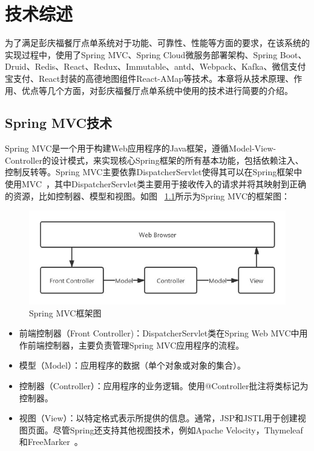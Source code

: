 \chapter{技术综述}
为了满足彭庆福餐厅点单系统对于功能、可靠性、性能等方面的要求，在该系统的实现过程中，使用了Spring MVC、Spring Cloud微服务部署架构、Spring Boot、Druid、Redis、React、Redux、Immutable、antd、Webpack、Kafka、微信支付宝支付、React封装的高德地图组件React-AMap等技术。本章将从技术原理、作用、优点等几个方面，对彭庆福餐厅点单系统中使用的技术进行简要的介绍。

\section{Spring MVC技术}
Spring MVC是一个用于构建Web应用程序的Java框架，遵循Model-View-Controller的设计模式，来实现核心Spring框架的所有基本功能，包括依赖注入、控制反转等。Spring MVC主要依靠DispatcherServlet使得其可以在Spring框架中使用MVC~\cite{tyd2019}，其中DispatcherServlet类主要用于接收传入的请求并将其映射到正确的资源，比如控制器、模型和视图。如图
~\ref{fig_springMVCCH2}所示为Spring MVC的框架图：
\begin{figure}[htbp!]
    \centering
    \includegraphics[width=5in]{FIGs/chapter2/springMVC.pdf}
    \caption{Spring MVC框架图}\label{fig_springMVCCH2}
\end{figure}
\begin{itemize}
  \item 前端控制器（Front Controller)：DispatcherServlet类在Spring Web MVC中用作前端控制器，主要负责管理Spring MVC应用程序的流程。
  \item 模型（Model）：应用程序的数据（单个对象或对象的集合）。
  \item 控制器（Controller）：应用程序的业务逻辑。使用@Controller批注将类标记为控制器。
  \item 视图（View）：以特定格式表示所提供的信息。通常，JSP和JSTL用于创建视图页面。尽管Spring还支持其他视图技术，例如Apache Velocity，Thymeleaf和FreeMarker~\cite{xf2012}。
\end{itemize}
